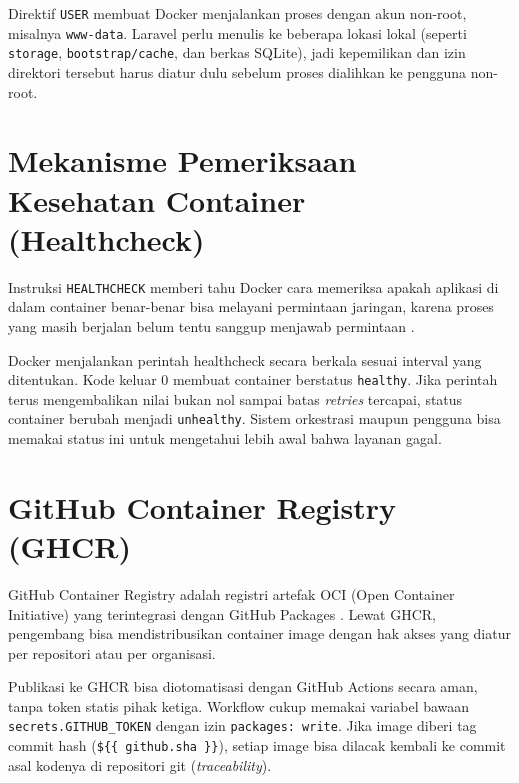\documentclass[a4paper,oneside,12pt]{report}
\begin{document}
Direktif \texttt{USER} membuat Docker menjalankan proses dengan akun non-root, misalnya \texttt{www-data}. Laravel perlu menulis ke beberapa lokasi lokal (seperti \texttt{storage}, \texttt{bootstrap/cache}, dan berkas SQLite), jadi kepemilikan dan izin direktori tersebut harus diatur dulu sebelum proses dialihkan ke pengguna non-root.

\section{Mekanisme Pemeriksaan Kesehatan Container (Healthcheck)}
Instruksi \texttt{HEALTHCHECK} memberi tahu Docker cara memeriksa apakah aplikasi di dalam container benar-benar bisa melayani permintaan jaringan, karena proses yang masih berjalan belum tentu sanggup menjawab permintaan \cite{docker-healthcheck}.

Docker menjalankan perintah healthcheck secara berkala sesuai interval yang ditentukan. Kode keluar 0 membuat container berstatus \texttt{healthy}. Jika perintah terus mengembalikan nilai bukan nol sampai batas \textit{retries} tercapai, status container berubah menjadi \texttt{unhealthy}. Sistem orkestrasi maupun pengguna bisa memakai status ini untuk mengetahui lebih awal bahwa layanan gagal.

\section{GitHub Container Registry (GHCR)}
GitHub Container Registry adalah registri artefak OCI (Open Container Initiative) yang terintegrasi dengan GitHub Packages \cite{github-ghcr}. Lewat GHCR, pengembang bisa mendistribusikan container image dengan hak akses yang diatur per repositori atau per organisasi.

Publikasi ke GHCR bisa diotomatisasi dengan GitHub Actions secara aman, tanpa token statis pihak ketiga. Workflow cukup memakai variabel bawaan \texttt{secrets.GITHUB\_TOKEN} dengan izin \texttt{packages: write}. Jika image diberi tag commit hash (\texttt{\$\{\{ github.sha \}\}}), setiap image bisa dilacak kembali ke commit asal kodenya di repositori git (\textit{traceability}).

\clearpage
\end{document}
